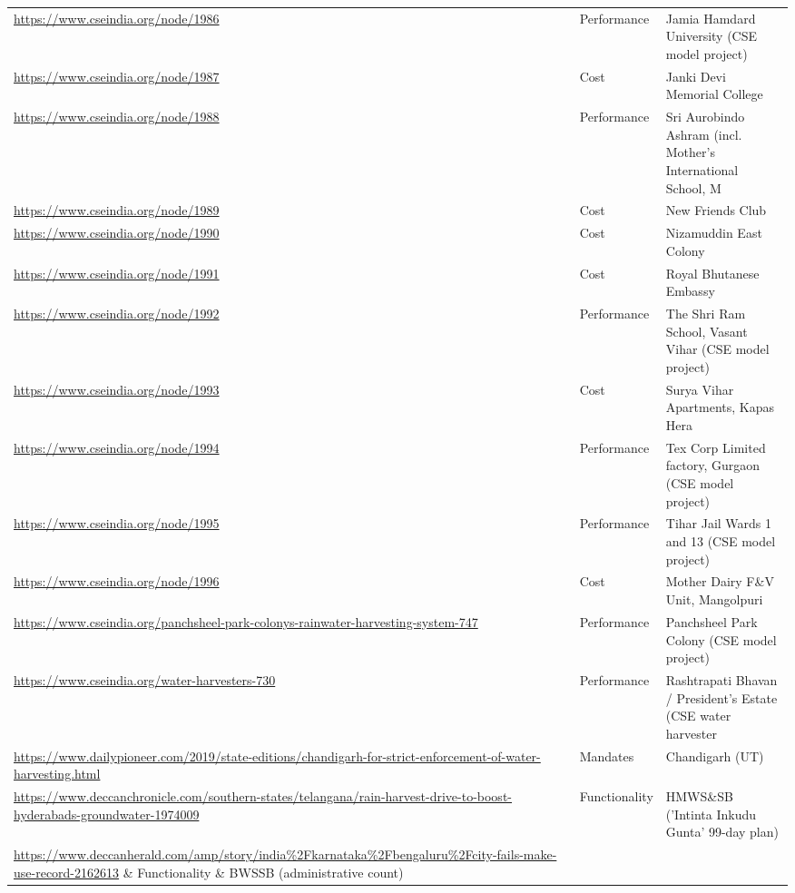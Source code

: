 {\begin{longtable}{p{9.2cm} p{2.5cm} p{4.2cm}}
\url{https://www.cseindia.org/node/1986} & Performance & Jamia Hamdard University (CSE model project)\\
\url{https://www.cseindia.org/node/1987} & Cost & Janki Devi Memorial College\\
\url{https://www.cseindia.org/node/1988} & Performance & Sri Aurobindo Ashram (incl. Mother's International School, M\\
\url{https://www.cseindia.org/node/1989} & Cost & New Friends Club\\
\url{https://www.cseindia.org/node/1990} & Cost & Nizamuddin East Colony\\
\url{https://www.cseindia.org/node/1991} & Cost & Royal Bhutanese Embassy\\
\url{https://www.cseindia.org/node/1992} & Performance & The Shri Ram School, Vasant Vihar (CSE model project)\\
\url{https://www.cseindia.org/node/1993} & Cost & Surya Vihar Apartments, Kapas Hera\\
\url{https://www.cseindia.org/node/1994} & Performance & Tex Corp Limited factory, Gurgaon (CSE model project)\\
\url{https://www.cseindia.org/node/1995} & Performance & Tihar Jail Wards 1 and 13 (CSE model project)\\
\url{https://www.cseindia.org/node/1996} & Cost & Mother Dairy F\&V Unit, Mangolpuri\\
\url{https://www.cseindia.org/panchsheel-park-colonys-rainwater-harvesting-system-747} & Performance & Panchsheel Park Colony (CSE model project)\\
\url{https://www.cseindia.org/water-harvesters-730} & Performance & Rashtrapati Bhavan / President's Estate (CSE water harvester\\
\url{https://www.dailypioneer.com/2019/state-editions/chandigarh-for-strict-enforcement-of-water-harvesting.html} & Mandates & Chandigarh (UT)\\
\url{https://www.deccanchronicle.com/southern-states/telangana/rain-harvest-drive-to-boost-hyderabads-groundwater-1974009} & Functionality & HMWS\&SB ('Intinta Inkudu Gunta' 99-day plan)\\
\url{https://www.deccanherald.com/amp/story/india%2Fkarnataka%2Fbengaluru%2Fcity-fails-make-use-record-2162613} & Functionality & BWSSB (administrative count)\\
\url{https://www.deccanherald.com/amp/story/india%2Fkarnataka%2Fbengaluru%2Fmonth-collected-in-penalties-746109.html} & Functionality & BWSSB (administrative count)\\

\end{longtable}}

